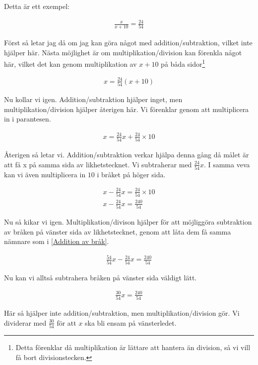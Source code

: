 Detta är ett exempel:

\begin{align}
	\frac{x}{x+10} = \frac{24}{54}
\end{align}

Först så letar jag då om jag kan göra något med addition/subtraktion, vilket inte hjälper här. Nästa möjlighet är om multiplikation/division kan förenkla något här, vilket det kan genom multiplikation av $x+10$ på båda sidor\footnote{Detta förenklar då multiplikation är lättare att hantera än division, så vi vill få bort divisionstecken.}

\begin{align}
	x = \frac{24}{54}(x+10)
\end{align}

Nu kollar vi igen. Addition/subtraktion hjälper inget, men multiplikation/division hjälper återigen här. Vi förenklar genom att multiplicera in i parantesen.

\begin{align}
	x = \frac{24}{54}x + \frac{24}{54} \times 10
\end{align}

Återigen så letar vi. Addition/subtraktion verkar hjälpa denna gång då målet är att få x på samma sida av likhetstecknet. Vi subtraherar med $\frac{24}{54}x$. I samma veva kan vi även multiplicera in $10$ i bråket på höger sida.

\begin{align}
	x - \frac{24}{54}x = \frac{24}{54} \times 10 \\
	x - \frac{24}{54}x = \frac{240}{54}
\end{align}

Nu så kikar vi igen. Multiplikation/divison hjälper för att möjliggöra subtraktion av bråken på vänster sida av likhetstecknet, genom att låta dem få samma nämnare som i \ref{Addition av bråk}.

\begin{align}
	\frac{54}{54}x - \frac{24}{54}x = \frac{240}{54}
\end{align}

Nu kan vi alltså subtrahera bråken på vänster sida väldigt lätt.

\begin{align}
	\frac{30}{54}x = \frac{240}{54}
\end{align}

Här så hjälper inte addition/subtraktion, men multiplikation/division gör. Vi dividerar med $\frac{30}{54}$ för att $x$ ska bli ensam på vänsterledet.

